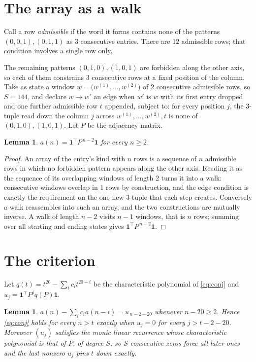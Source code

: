 \documentclass[11pt,a4paper]{article}
\theoremstyle{plain}
\newtheorem{lemma}[theorem]{Lemma}
\theoremstyle{definition}
\begin{document}
\section{The array as a walk}

Call a row \emph{admissible} if the word it forms contains none of the patterns
$(0,0,1), (0,1,1)$ as $3$ consecutive entries. There are $12$ admissible rows; that condition
involves a single row only.

The remaining patterns $(0,1,0), (1,0,1)$ are forbidden along the other axis, so each of them
constrains $3$ consecutive rows at a fixed position of the column. Take as state a
window $w=\bigl(w^{(1)},\dots,w^{(2)}\bigr)$ of $2$ consecutive admissible
rows, so $S=144$, and declare $w\to w'$ an edge when $w'$ is $w$ with its first entry
dropped and one further admissible row $t$ appended, subject to: for every position
$j$, the $3$-tuple read down the column $j$ across $w^{(1)},\dots,w^{(2)},t$
is none of $(0,1,0), (1,0,1)$. Let $P$ be the adjacency matrix.

\begin{lemma}\label{lem:walk}
$a(n)=\mathbf{1}^{\!\top}P^{\,n-2}\mathbf{1}$ for every $n\ge2$.
\end{lemma}

\begin{proof}
An array of the entry's kind with $n$ rows is a sequence of $n$ admissible rows in
which no forbidden pattern appears along the other axis. Reading it as the sequence of its
overlapping windows of length $2$ turns it into a walk: consecutive windows overlap in
$1$ rows by construction, and the edge condition is exactly the requirement on the one
new $3$-tuple that each step creates. Conversely a walk reassembles into such an array,
and the two constructions are mutually inverse. A walk of length $n-2$ visits $n-1$
windows, that is $n$ rows; summing over all starting and ending states gives
$\mathbf{1}^{\!\top}P^{\,n-2}\mathbf{1}$.
\end{proof}

\section{The criterion}

Let $q(t)=t^{20}-\sum_i c_i t^{20-i}$ be the characteristic polynomial of
\eqref{eq:conj} and $u_j=\mathbf{1}^{\!\top}P^{j}q(P)\mathbf{1}$.

\begin{lemma}\label{lem:crit}
$a(n)-\sum_i c_i a(n-i)=u_{\,n-2-20}$ whenever $n-20\ge2$. Hence
\eqref{eq:conj} holds for every $n>t$ exactly when $u_j=0$ for every
$j>t-2-20$. Moreover $(u_j)$ satisfies the monic linear recurrence whose
characteristic polynomial is that of $P$, of degree $S$, so $S$ consecutive zeros force all
later ones and the last nonzero $u_j$ pins $t$ down exactly.
\end{lemma}
\end{document}
